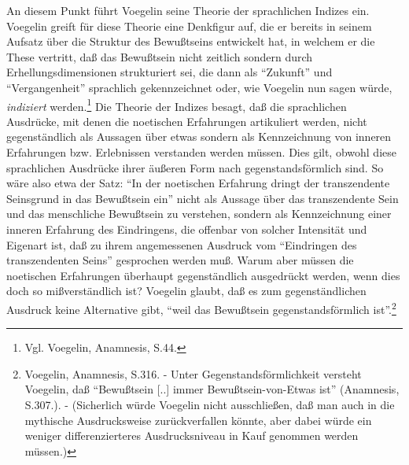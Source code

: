 An diesem Punkt führt Voegelin seine Theorie der sprachlichen Indizes ein.
Voegelin greift für diese Theorie eine Denkfigur auf, die er bereits in seinem
Aufsatz über die Struktur des Bewußtseins entwickelt hat, in welchem er
die These vertritt, daß das Bewußtsein nicht zeitlich sondern durch
Erhellungsdimensionen strukturiert sei, die dann als "`Zukunft"' und
"`Vergangenheit"' sprachlich gekennzeichnet oder, wie Voegelin nun sagen
würde, {\it indiziert} werden.\footnote{Vgl. Voegelin, Anamnesis, S.44.} Die
Theorie der Indizes besagt, daß die sprachlichen Ausdrücke, mit denen die
noetischen Erfahrungen artikuliert werden, nicht gegenständlich als Aussagen
über etwas sondern als Kennzeichnung von inneren Erfahrungen bzw. Erlebnissen
verstanden werden müssen. Dies gilt, obwohl diese sprachlichen Ausdrücke ihrer
äußeren Form nach gegenstandsförmlich sind. So wäre also etwa der Satz: "`In
der noetischen Erfahrung dringt der transzendente Seinsgrund in das Bewußtsein
ein"' nicht als Aussage über das transzendente Sein und das menschliche
Bewußtsein zu verstehen, sondern als Kennzeichnung einer inneren Erfahrung des
Eindringens, die offenbar von solcher Intensität und Eigenart ist, daß zu
ihrem angemessenen Ausdruck vom "`Eindringen des transzendenten Seins"'
gesprochen werden muß. Warum aber müssen die noetischen Erfahrungen überhaupt
gegenständlich ausgedrückt werden, wenn dies doch so mißverständlich ist?
Voegelin glaubt, daß es zum gegenständlichen Ausdruck keine Alternative gibt,
"`weil das Bewußtsein gegenstandsförmlich ist"'.\footnote{Voegelin, Anamnesis,
  S.316. - Unter Gegenstandsförmlichkeit versteht Voegelin, daß "`Bewußtsein
  [..] immer Bewußtsein-von-Etwas ist"' (Anamnesis, S.307.). - (Sicherlich
  würde Voegelin nicht ausschließen, daß man auch in die mythische
  Ausdrucksweise zurückverfallen könnte, aber dabei würde ein weniger
  differenzierteres Ausdrucksniveau in Kauf genommen werden müssen.)}

